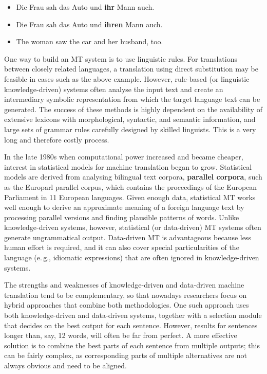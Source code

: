 \documentclass[]{../../metanetpaper}
\begin{document}
\begin{multicols}{2}
\begin{itemize}
\item Die Frau sah das Auto und \textbf{ihr} Mann auch.
\item Die Frau sah das Auto und \textbf{ihren} Mann auch.
\item The woman saw the car and her husband, too.
\end{itemize}

One way to build an MT system is to use linguistic rules. For translations between closely related languages, a translation using direct substitution may be feasible in cases such as the above example. However, rule-based (or linguistic knowledge-driven) systems often analyse the input text and create an intermediary symbolic representation from which the target language text can be generated. The success of these methods is highly dependent on the availability of extensive lexicons with morphological, syntactic, and semantic information, and large sets of grammar rules carefully designed by skilled linguists. This is a very long and therefore costly process.

In the late 1980s when computational power increased and became cheaper, interest in statistical models for machine translation began to grow. Statistical models are derived from analysing bilingual text corpora, \textbf{parallel corpora}, such as the Europarl parallel corpus, which contains the proceedings of the European Parliament in 11 European languages. Given enough data, statistical MT works well enough to derive an approximate meaning of a foreign language text by processing parallel versions and finding plausible patterns of words. Unlike knowledge-driven systems, however, statistical (or data-driven) MT systems often generate ungrammatical output. Data-driven MT is advantageous because less human effort is required, and it can also cover special particularities of the language (e.\,g., idiomatic expressions) that are often ignored in knowledge-driven systems. 

The strengths and weaknesses of knowledge-driven and data-driven machine translation tend to be complementary, so that nowadays researchers focus on hybrid approaches that combine both methodologies. One such approach uses both knowledge-driven and data-driven systems, together with a selection module that decides on the best output for each sentence. However, results for sentences longer than, say, 12 words, will often be far from perfect. A more effective solution is to combine the best parts of each sentence from multiple outputs; this can be fairly complex, as corresponding parts of multiple alternatives are not always obvious and need to be aligned. 


\end{multicols}
\end{document}
